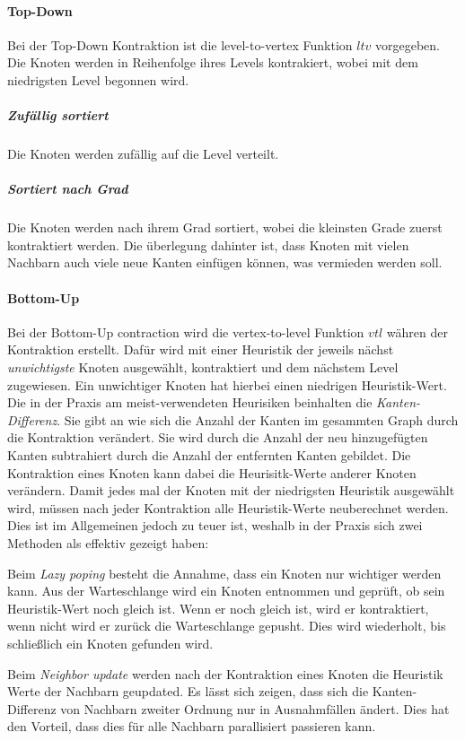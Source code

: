 \paragraph{Top-Down}

Bei der Top-Down Kontraktion ist die level-to-vertex Funktion ${ltv}$ vorgegeben.
Die Knoten werden in Reihenfolge ihres Levels kontrakiert, wobei mit dem niedrigsten Level begonnen wird.

\subparagraph{Zufällig sortiert}
Die Knoten werden zufällig auf die Level verteilt. 

\subparagraph{Sortiert nach Grad}
Die Knoten werden nach ihrem Grad sortiert, wobei die kleinsten Grade zuerst kontraktiert werden.
Die überlegung dahinter ist, dass Knoten mit vielen Nachbarn auch viele neue Kanten einfügen können, was vermieden werden soll.


\paragraph{Bottom-Up}

Bei der Bottom-Up contraction wird die vertex-to-level Funktion ${vtl}$ währen der Kontraktion erstellt.
Dafür wird mit einer Heuristik der jeweils nächst \emph{unwichtigste} Knoten ausgewählt, kontraktiert und dem nächstem Level zugewiesen.
Ein unwichtiger Knoten hat hierbei einen niedrigen Heuristik-Wert.
Die in der Praxis am meist-verwendeten Heurisiken beinhalten die \emph{Kanten-Differenz}.
Sie gibt an wie sich die Anzahl der Kanten im gesammten Graph durch die Kontraktion verändert.
Sie wird durch die Anzahl der neu hinzugefügten Kanten subtrahiert durch die Anzahl der entfernten Kanten gebildet.
Die Kontraktion eines Knoten kann dabei die Heurisitk-Werte anderer Knoten verändern.
Damit jedes mal der Knoten mit der niedrigsten Heuristik ausgewählt wird, müssen nach jeder Kontraktion alle Heuristik-Werte neuberechnet werden.
Dies ist im Allgemeinen jedoch zu teuer ist, weshalb in der Praxis sich zwei Methoden als effektiv gezeigt haben:

Beim \emph{Lazy poping} besteht die Annahme, dass ein Knoten nur wichtiger werden kann.
Aus der Warteschlange wird ein Knoten entnommen und geprüft, ob sein Heuristik-Wert noch gleich ist.
Wenn er noch gleich ist, wird er kontraktiert, wenn nicht wird er zurück die Warteschlange gepusht.
Dies wird wiederholt, bis schließlich ein Knoten gefunden wird.

Beim \emph{Neighbor update} werden nach der Kontraktion eines Knoten die Heuristik Werte der Nachbarn geupdated.
Es lässt sich zeigen, dass sich die Kanten-Differenz von Nachbarn zweiter Ordnung nur in Ausnahmfällen ändert. 
Dies hat den Vorteil, dass dies für alle Nachbarn parallisiert passieren kann.


